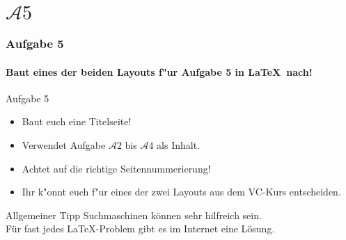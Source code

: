 \section{$\mathcal{A}5$}

\begin{frame}
\frametitle{Aufgabe 5}
\framesubtitle{Baut eines der beiden Layouts f"ur Aufgabe 5 in \LaTeX ~nach!}

\begin{block}{Aufgabe 5}
\begin{itemize}
\item Baut euch eine Titelseite!%
\item Verwendet Aufgabe $\mathcal{A}2$ bis $\mathcal{A}4$ als Inhalt.%
\item Achtet auf die richtige Seitennummerierung!%
\item Ihr k"onnt euch f"ur eines der zwei Layouts aus dem VC-Kurs entscheiden.%
\end{itemize}
\end{block}

\begin{exampleblock}{Allgemeiner Tipp}
Suchmaschinen können sehr hilfreich sein. \\ Für fast jedes \LaTeX-Problem gibt es im Internet eine Lösung.
\end{exampleblock}

\end{frame}